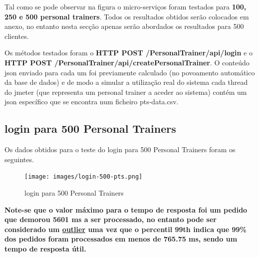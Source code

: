 \hspace{5mm} Tal como se pode observar na figura o micro-serviços foram testados para \textbf{100, 250 e 500 personal trainers}. Todos os resultados obtidos serão colocados em anexo, no entanto nesta secção apenas serão abordados os resultados para 500 clientes.

\hspace{5mm} Os métodos testados  foram o \textbf{HTTP POST /PersonalTrainer/api/login} e o \textbf{HTTP POST /PersonalTrainer/api/createPersonalTrainer}. O conteúdo json enviado para cada um foi previamente calculado (no povoamento automático da base de dados) e de modo a simular a utilização real do sistema cada thread do jmeter (que representa um personal trainer a aceder ao sistema) contém um json específico que se encontra num ficheiro pts-data.csv.


\subsection{login para 500 Personal Trainers}

\hspace{5mm} Os dados obtidos para o teste do login para 500 Personal Trainers foram os seguintes.

\begin{figure}[H]
    \centering
    \texttt{[image: images/login-500-pts.png]}
    \caption{login para 500 Personal Trainers}
    \label{fig:login500}
\end{figure}

\hspace{5mm} \textbf{Note-se que o valor máximo para o tempo de resposta foi um pedido que demorou 5601 ms a ser processado, no entanto pode ser considerado um \href{https://en.wikipedia.org/wiki/Outlier}{outlier} uma vez que o percentil 99th indica que 99\% dos pedidos foram processados em menos de 765.75 ms, sendo um tempo de resposta útil.}